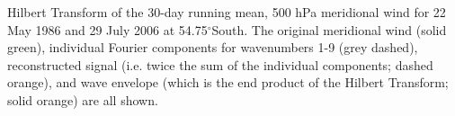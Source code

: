 \label{fig:example_hilbert}
Hilbert Transform of the 30-day running mean, 500 hPa meridional wind for 22 May 1986 and 29 July 2006 at 54.75$^{\circ}$South. The original meridional wind (solid green), individual Fourier components for wavenumbers 1-9 (grey dashed), reconstructed signal (i.e. twice the sum of the individual components; dashed orange), and wave envelope (which is the end product of the Hilbert Transform; solid orange) are all shown. 
